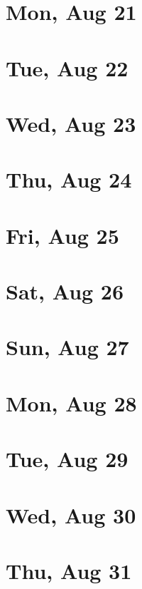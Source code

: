 	\section{Mon, Aug 21}
		
	\section{Tue, Aug 22}
		
	\section{Wed, Aug 23}
		
	\section{Thu, Aug 24}
		
	\section{Fri, Aug 25}
		
	\section{Sat, Aug 26}
		
	\section{Sun, Aug 27}
		
	\section{Mon, Aug 28}
		
	\section{Tue, Aug 29}
		
	\section{Wed, Aug 30}
		
	\section{Thu, Aug 31}
		

